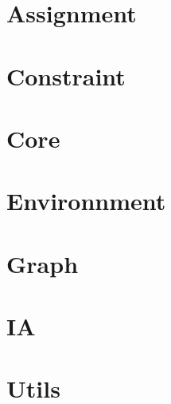 
\section{Assignment}


\section{Constraint}


\section{Core}


\section{Environnment}


\section{Graph}


\section{IA}



\section{Utils}


